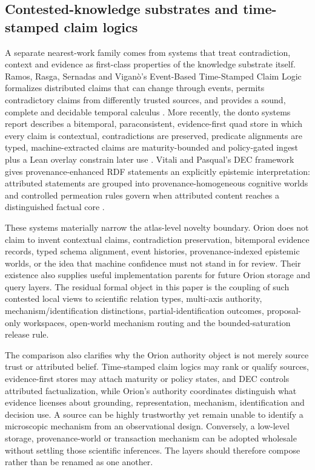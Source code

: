 \subsection{Contested-knowledge substrates and time-stamped claim logics}

A separate nearest-work family comes from systems that treat contradiction, context and evidence as first-class properties of the knowledge substrate itself. Ramos, Rasga, Sernadas and Vigan\`o's Event-Based Time-Stamped Claim Logic formalizes distributed claims that can change through events, permits contradictory claims from differently trusted sources, and provides a sound, complete and decidable temporal calculus \cite{ramos2021eventclaim}. More recently, the donto systems report describes a bitemporal, paraconsistent, evidence-first quad store in which every claim is contextual, contradictions are preserved, predicate alignments are typed, machine-extracted claims are maturity-bounded and policy-gated ingest plus a Lean overlay constrain later use \cite{donto2026}. Vitali and Pasqual's DEC framework gives provenance-enhanced RDF statements an explicitly epistemic interpretation: attributed statements are grouped into provenance-homogeneous cognitive worlds and controlled permeation rules govern when attributed content reaches a distinguished factual core \cite{vitali2026dec}.

These systems materially narrow the atlas-level novelty boundary. Orion does not claim to invent contextual claims, contradiction preservation, bitemporal evidence records, typed schema alignment, event histories, provenance-indexed epistemic worlds, or the idea that machine confidence must not stand in for review. Their existence also supplies useful implementation parents for future Orion storage and query layers. The residual formal object in this paper is the coupling of such contested local views to scientific relation types, multi-axis authority, mechanism/identification distinctions, partial-identification outcomes, proposal-only workspaces, open-world mechanism routing and the bounded-saturation release rule.

The comparison also clarifies why the Orion authority object is not merely source trust or attributed belief. Time-stamped claim logics may rank or qualify sources, evidence-first stores may attach maturity or policy states, and DEC controls attributed factualization, while Orion's authority coordinates distinguish what evidence licenses about grounding, representation, mechanism, identification and decision use. A source can be highly trustworthy yet remain unable to identify a microscopic mechanism from an observational design. Conversely, a low-level storage, provenance-world or transaction mechanism can be adopted wholesale without settling those scientific inferences. The layers should therefore compose rather than be renamed as one another.
